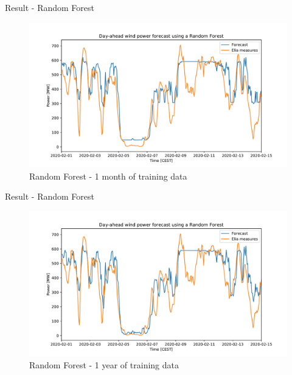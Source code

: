 \documentclass[12pt]{beamer}
\begin{document}
\begin{frame}{Result - Random Forest}
    \begin{figure}
        \centering
        \includegraphics[width=\textwidth]{resources/pdf/rf_one_month.pdf}
        \caption{Random Forest - 1 month of training data}
    \end{figure}
\end{frame}

\begin{frame}{Result - Random Forest}
    \begin{figure}
        \centering
        \includegraphics[width=\textwidth]{resources/pdf/rf_one_year.pdf}
        \caption{Random Forest - 1 year of training data}
    \end{figure}
\end{frame}
\end{document}
